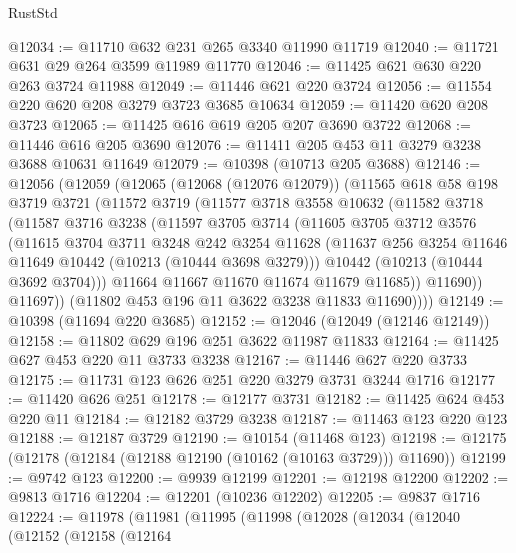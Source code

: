 \begin{lexlean}{RustStd}
\begin{coremodule}
{\begin{coremodule}
{{{{{{{{{{{{{{{{{{{{{{{{{{@12034 := @11710 @632 @231 @265 @3340 @11990 @11719
@12040 := @11721 @631 @29 @264 @3599 @11989 @11770
@12046 := @11425 @621 @630 @220 @263 @3724 @11988
@12049 := @11446 @621 @220 @3724
@12056 := @11554 @220 @620 @208 @3279 @3723 @3685 @10634
@12059 := @11420 @620 @208 @3723
@12065 := @11425 @616 @619 @205 @207 @3690 @3722
@12068 := @11446 @616 @205 @3690
@12076 := @11411 @205 @453 @11 @3279 @3238 @3688 @10631 @11649
@12079 := @10398 (@10713 @205 @3688)
@12146 := @12056
    (@12059
      (@12065
        (@12068 (@12076 @12079))
        (@11565
          @618
          @58
          @198
          @3719
          @3721
          (@11572
            @3719
            (@11577
              @3718
              @3558
              @10632
              (@11582
                @3718
                (@11587
                  @3716
                  @3238
                  (@11597
                    @3705
                    @3714
                    (@11605
                      @3705
                      @3712
                      @3576
                      (@11615
                        @3704
                        @3711
                        @3248
                        @242
                        @3254
                        @11628
                        (@11637 @256 @3254 @11646 @11649 @10442 (@10213 (@10444 @3698 @3279)))
                        @10442
                        (@10213 (@10444 @3692 @3704)))
                      @11664
                      @11667
                      @11670
                      @11674
                      @11679
                      @11685))
                  @11690))
              @11697))
          (@11802 @453 @196 @11 @3622 @3238 @11833 @11690))))
@12149 := @10398 (@11694 @220 @3685)
@12152 := @12046 (@12049 (@12146 @12149))
@12158 := @11802 @629 @196 @251 @3622 @11987 @11833
@12164 := @11425 @627 @453 @220 @11 @3733 @3238
@12167 := @11446 @627 @220 @3733
@12175 := @11731 @123 @626 @251 @220 @3279 @3731 @3244 @1716
@12177 := @11420 @626 @251
@12178 := @12177 @3731
@12182 := @11425 @624 @453 @220 @11
@12184 := @12182 @3729 @3238
@12187 := @11463 @123 @220 @123
@12188 := @12187 @3729
@12190 := @10154 (@11468 @123)
@12198 := @12175 (@12178 (@12184 (@12188 @12190 (@10162 (@10163 @3729))) @11690))
@12199 := @9742 @123
@12200 := @9939 @12199
@12201 := @12198 @12200
@12202 := @9813 @1716
@12204 := @12201 (@10236 @12202)
@12205 := @9837 @1716
@12224 := @11978
    (@11981
      (@11995
        (@11998
          (@12028
            (@12034
              (@12040
                (@12152
                  (@12158
                    (@12164
}}}}}}}}}}}}}}}}}}}}}}}}}}
\end{coremodule}}
\end{coremodule}
\end{lexlean}
